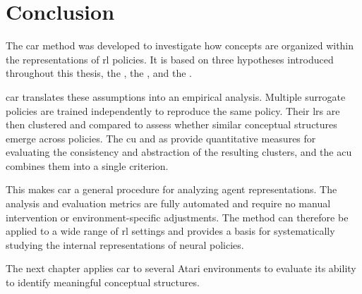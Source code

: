 \section{Conclusion}
\label{sec:clustering_agent_representations_conclusion}

The \gls{car} method was developed to investigate how concepts are organized within the representations of \gls{rl} policies.
It is based on three hypotheses introduced throughout this thesis, the \MechanisticHypothesisName, the \ConceptHypothesisName, and the \RepresentationConvergenceHypothesisName.

\gls{car} translates these assumptions into an empirical analysis.
Multiple surrogate policies are trained independently to reproduce the same policy.
Their \glspl{lr} are then clustered and compared to assess whether similar conceptual structures emerge across policies.
The \gls{cu} and \gls{as} provide quantitative measures for evaluating the consistency and abstraction of the resulting clusters, and the \gls{acu} combines them into a single criterion.

This makes \gls{car} a general procedure for analyzing agent representations.
The analysis and evaluation metrics are fully automated and require no manual intervention or environment-specific adjustments.
The method can therefore be applied to a wide range of \gls{rl} settings and provides a basis for systematically studying the internal representations of neural policies.

The next chapter applies \gls{car} to several Atari environments to evaluate its ability to identify meaningful conceptual structures.

